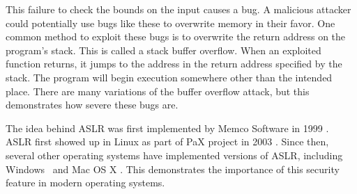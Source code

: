 This failure to check the bounds on the input causes a bug. A malicious attacker could potentially use bugs like these to overwrite memory in their favor. One common method to exploit these bugs is to overwrite the return address on the program's stack. This is called a stack buffer overflow. When an exploited function returns, it jumps to the address in the return address specified by the stack. The program will begin execution somewhere other than the intended place. There are many variations of the buffer overflow attack, but this demonstrates how severe these bugs are.

The idea behind ASLR was first implemented by Memco Software in 1999 \cite{yarom1999method}. ASLR first showed up in Linux as part of PaX project in 2003 \cite{paxdocs}. Since then, several other operating systems have implemented versions of ASLR, including Windows~\cite{msexploitmitigation} and Mac OS X \cite{applesecurity}. This demonstrates the importance of this security feature in modern operating systems.
